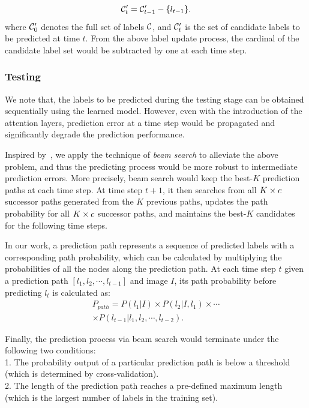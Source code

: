 \documentclass[letterpaper]{article} %
\begin{document}
\begin{equation}
\label{eq:cand_pool}
\mathcal{C}'_t = \mathcal{C}'_{t-1} - \{l_{t-1}\}.
\end{equation}
where $\mathcal{C}'_0$ denotes the full set of labels $\mathcal{C}$, and $\mathcal{C}'_t$ is the set of candidate labels to be predicted at time $t$. From the above label update process, the cardinal of the candidate label set would be subtracted by one at each time step.

\subsubsection{Testing}
We note that, the labels to be predicted during the testing stage can be obtained sequentially using the learned model. However, even with the introduction of the attention layers, prediction error at a time step would be propagated and significantly degrade the prediction performance.

Inspired by~\cite{wang2016cnn}, we apply the technique of \emph{beam search} to alleviate the above problem, and thus the predicting process would be more robust to intermediate prediction errors. More precisely, beam search would keep the best-$K$ prediction paths at each time step. At time step $t+1$, it then searches from all $K\times c$ successor paths generated from the $K$ previous paths, updates the path probability for all $K\times c$ successor paths, and maintains the best-$K$ candidates for the following time steps.

In our work, a prediction path represents a sequence of predicted labels with a corresponding path probability, which can be calculated by multiplying the probabilities of all the nodes along the prediction path. At each time step $t$ given a prediction path $[l_1, l_2,\cdots, l_{t-1}]$ and image $I$, its path probability before predicting $l_t$ is calculated as:
\begin{equation}
\begin{aligned}
\label{eq:beam_search}
P_{path} = P(l_1|I) \times P(l_2|I, l_1) \times \cdots \\\times P(l_{t-1}|l_1, l_2, \cdots, l_{t-2}).
\end{aligned}
\end{equation}

Finally, the prediction process via beam search would terminate under the following two conditions:\\
1. The probability output of a particular prediction path is below a threshold (which is determined by cross-validation).\\
2. The length of the prediction path reaches a pre-defined maximum length (which is the largest number of labels in the training set).\\
\end{document}
